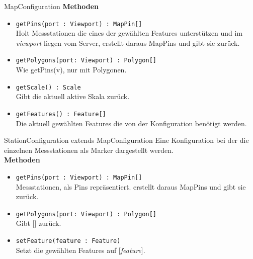 \begin{Class}{MapConfiguration}
    \textbf{Methoden}
    \begin{itemize}
        \item \texttt{getPins(port : Viewport) : MapPin[]}
        \\ Holt Messstationen die eines der gewählten Features unterstützen und im \emph{viewport} liegen vom Server,
        erstellt daraus MapPins und gibt sie zurück.
        \item \texttt{getPolygons(port: Viewport) : Polygon[]}
        \\ Wie getPins(v), nur mit Polygonen. 
        \item \texttt{getScale() : Scale}
        \\ Gibt die aktuell aktive Skala zurück.
        \item \texttt{getFeatures() : Feature[]}
        \\ Die aktuell gewählten Features die von der Konfiguration benötigt werden.
    \end{itemize}
\end{Class}

\begin{Class}{StationConfiguration extends MapConfiguration}
    Eine Konfiguration bei der die einzelnen Messstationen als Marker dargestellt werden.
    \bigskip\\
    \textbf{Methoden}
    \begin{itemize}
        \item \texttt{getPins(port : Viewport) : MapPin[]}
        \\ Messstationen, als Pins repräsentiert.
        erstellt daraus MapPins und gibt sie zurück.
        \item \texttt{getPolygons(port: Viewport) : Polygon[]}
        \\ Gibt [] zurück.
        \bigskip
        \item \texttt{setFeature(feature : Feature)}
        \\ Setzt die gewählten Features auf [\emph{feature}].
    \end{itemize}
\end{Class}

